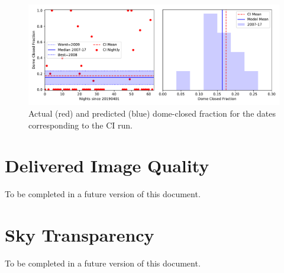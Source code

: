 \documentclass[12pt]{article}
\begin{document}
\begin{figure}[htb]
\begin{center}
\includegraphics[width=6in]{CIdome}
\caption{Actual (red) and predicted (blue) dome-closed fraction for the dates corresponding to the CI run.}
\label{fig:CIdome}
\end{center}
\end{figure}

\section{Delivered Image Quality}

To be completed in a future version of this document.

\section{Sky Transparency}

To be completed in a future version of this document.



\end{document}
